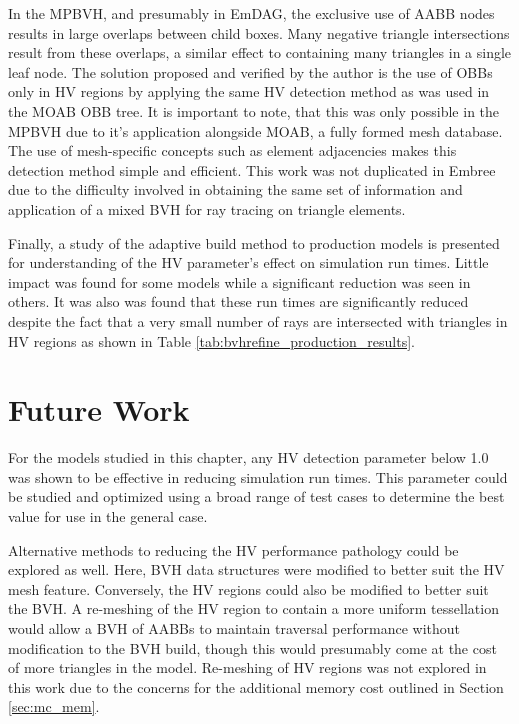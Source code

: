 In the MPBVH, and presumably in EmDAG, the exclusive use of AABB nodes results
in large overlaps between child boxes. Many negative triangle intersections
result from these overlaps, a similar effect to containing many
triangles in a single leaf node. The solution proposed and verified by the
author is the use of OBBs only in HV regions by applying the same HV detection
method as was used in the MOAB OBB tree. It is important to note, that this was
only possible in the MPBVH due to it's application alongside MOAB, a fully
formed mesh database. The use of mesh-specific concepts such as element
adjacencies makes this detection method simple and efficient. This work was not
duplicated in Embree due to the difficulty involved in obtaining the same set of
information and application of a mixed BVH for ray tracing on triangle elements.

Finally, a study of the adaptive build method to production models is presented
for understanding of the HV parameter's effect on simulation run times. Little
impact was found for some models while a significant reduction was seen in
others. It was also was found that these run times are significantly reduced
despite the fact that a very small number of rays are intersected with triangles
in HV regions as shown in Table \ref{tab:bvhrefine_production_results}.

\section{Future Work}

For the models studied in this chapter, any HV detection parameter below 1.0 was
shown to be effective in reducing simulation run times. This parameter could be
studied and optimized using a broad range of test cases to determine the best
value for use in the general case.

Alternative methods to reducing the HV performance pathology could be explored
as well. Here, BVH data structures were modified to better suit the HV mesh
feature. Conversely, the HV regions could also be modified to better suit the
BVH. A re-meshing of the HV region to contain a more uniform tessellation would
allow a BVH of AABBs to maintain traversal performance without modification to
the BVH build, though this would presumably come at the cost of more triangles
in the model. Re-meshing of HV regions was not explored in this work due to the
concerns for the additional memory cost outlined in Section \ref{sec:mc_mem}.
